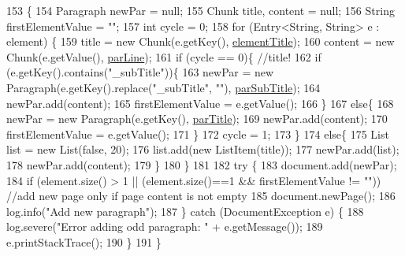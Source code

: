 \begin{DoxyCode}
153                                                                                      \{
154         Paragraph newPar = null;
155         Chunk title, content = null;
156         String firstElementValue = \textcolor{stringliteral}{""};
157         \textcolor{keywordtype}{int} cycle = 0;
158         \textcolor{keywordflow}{for} (Entry<String, String> e : element) \{
159             title = \textcolor{keyword}{new} Chunk(e.getKey(), \hyperlink{classit_1_1isislab_1_1masonhelperdocumentation_1_1mason_1_1control_1_1_p_d_f_generator_aef4e775d865ce931436933184abfcafa}{elementTitle});
160             content = \textcolor{keyword}{new} Chunk(e.getValue(), \hyperlink{classit_1_1isislab_1_1masonhelperdocumentation_1_1mason_1_1control_1_1_p_d_f_generator_a4887bc031c4ee6469cf807e7cd1afca6}{parLine});
161             \textcolor{keywordflow}{if} (cycle == 0)\{    \textcolor{comment}{//title!}
162                 \textcolor{keywordflow}{if} (e.getKey().contains(\textcolor{stringliteral}{"\_subTitle"}))\{
163                     newPar = \textcolor{keyword}{new} Paragraph(e.getKey().replace(\textcolor{stringliteral}{"\_subTitle"}, \textcolor{stringliteral}{""}), 
      \hyperlink{classit_1_1isislab_1_1masonhelperdocumentation_1_1mason_1_1control_1_1_p_d_f_generator_ac4f2d6c81c14b60dcddfc358b9296ee5}{parSubTitle});
164                     newPar.add(content);
165                     firstElementValue = e.getValue();
166                 \}
167                 \textcolor{keywordflow}{else}\{
168                     newPar = \textcolor{keyword}{new} Paragraph(e.getKey(), \hyperlink{classit_1_1isislab_1_1masonhelperdocumentation_1_1mason_1_1control_1_1_p_d_f_generator_a74f4e5e2095668aa762c3c3df4325c74}{parTitle});
169                     newPar.add(content);
170                     firstElementValue = e.getValue();
171                 \}
172                 cycle = 1;
173             \}
174             \textcolor{keywordflow}{else}\{
175                 List list = \textcolor{keyword}{new} List(\textcolor{keyword}{false}, 20);
176                 list.add(\textcolor{keyword}{new} ListItem(title));
177                 newPar.add(list);
178                 newPar.add(content);
179             \}
180         \}
181 
182         \textcolor{keywordflow}{try} \{           
183             document.add(newPar);
184             \textcolor{keywordflow}{if} (element.size() > 1 || (element.size()==1 && firstElementValue != \textcolor{stringliteral}{""}))   \textcolor{comment}{//add new page only
       if page content is not empty}
185                 document.newPage();
186             log.info(\textcolor{stringliteral}{"Add new paragraph"});
187         \} \textcolor{keywordflow}{catch} (DocumentException e) \{
188             log.severe(\textcolor{stringliteral}{"Error adding odd paragraph: "} + e.getMessage());
189             e.printStackTrace();
190         \}
191     \}
\end{DoxyCode}


